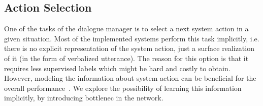 \subsection{Action Selection}
One of the tasks of the dialogue manager is to select a next system action in a given  situation.
Most of the implemented systems perform this task implicitly, i.e. there is no explicit representation of the system action, just a surface realization of it (in the form of verbalized utterance).
The reason for this option is that it requires less supervised labels which might be hard and costly to obtain.
However, modeling the information about system action can be beneficial for the overall performance~\cite{DBLP:conf/aaai/LiangTCY20}.
We explore the possibility of learning this information implicitly, by introducing bottlenec in the network.

